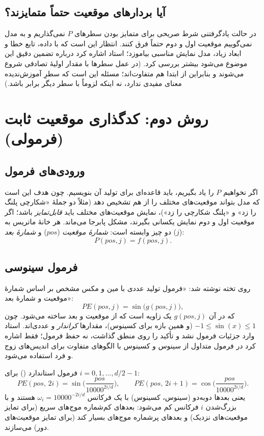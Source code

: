 \subsection{آیا بردارهای موقعیت حتماً متمایزند؟}
در حالت یادگرفتنی شرط صریحی برای متمایز بودن سطرهای $P$ نمی‌گذاریم و به مدل نمی‌گوییم موقعیت اول و دوم حتماً فرق کنند. انتظار این است که با داده، تابع خطا و ابعاد زیاد، مدل نمایش مناسبی بیاموزد؛ استاد اشاره کرد درباره تضمین دقیق این موضوع می‌شود بیشتر بررسی کرد. (در عمل سطرها با مقدار اولیهٔ تصادفی شروع می‌شوند و بنابراین از ابتدا هم متفاوت‌اند؛ مسئله این است که سطرِ آموزش‌ندیده معنای مفیدی ندارد، نه اینکه لزوماً با سطر دیگر برابر باشد.)

\section{روش دوم: کدگذاری موقعیت ثابت (فرمولی)}

\subsection{ورودی‌های فرمول}
اگر نخواهیم $P$ را یاد بگیریم، باید قاعده‌ای برای تولید آن بنویسیم. چون هدف این است که مدل بتواند موقعیت‌های مختلف را از هم تشخیص دهد (مثلاً دو جملهٔ «شکارچی پلنگ را زد» و «پلنگ شکارچی را زد»)، نمایش موقعیت‌های مختلف باید \emph{قابل‌تمایز} باشد؛ اگر موقعیت اول و دوم نمایش یکسانی بگیرند، مشکل پابرجا می‌ماند. هر خانهٔ ماتریس به دو چیز وابسته است: \emph{شمارهٔ موقعیت} ($pos$) و \emph{شمارهٔ بعد} ($j$):
\[
P(pos,j)=f(pos,j).
\]

\subsection{فرمول سینوسی}
روی تخته نوشته شد: «فرمول تولید عددی با مین و مکس مشخص بر اساس شمارهٔ موقعیت و شمارهٔ بعد»:
\[
PE(pos,j)=\sin\big(g(pos,j)\big),
\]
که در آن $g(pos,j)$ یک زاویه است که از موقعیت و بعد ساخته می‌شود. چون $-1\le\sin(x)\le 1$ (و همین بازه برای کسینوس)، مقدارها \emph{کراندار} و عددی‌اند. استاد وارد جزئیات فرمول نشد و تأکید را روی منطق گذاشت، نه حفظ فرمول؛ فقط اشاره کرد در فرمول متداول از سینوس و کسینوس با الگوهای متفاوت برای اندیس‌های زوج و فرد استفاده می‌شود.


\begin{definitionbox}{فرمول استاندارد ()}
برای $i=0,1,\dots,d/2-1$:
\[
PE(pos,\,2i)=\sin\!\Big(\frac{pos}{10000^{2i/d}}\Big),\qquad
PE(pos,\,2i+1)=\cos\!\Big(\frac{pos}{10000^{2i/d}}\Big).
\]
یعنی بعدها دو‌به‌دو (سینوس، کسینوس) با یک فرکانس $\omega_i=10000^{-2i/d}$ هستند و با بزرگ‌شدن $i$ فرکانس کم می‌شود: بعدهای کم‌شماره موج‌های سریع (برای تمایز موقعیت‌های نزدیک) و بعدهای پرشماره موج‌های بسیار کند (برای تمایز موقعیت‌های دور) می‌سازند.
\end{definitionbox}

